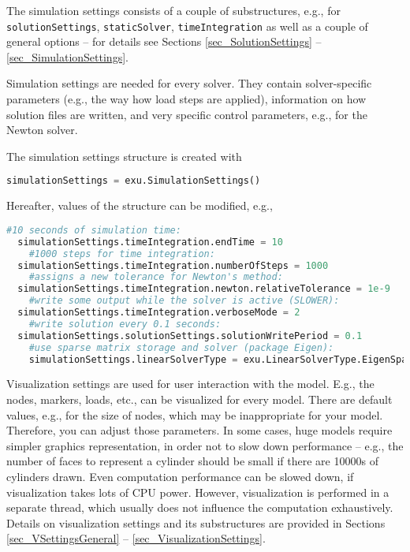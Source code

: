 The simulation settings consists of a couple of substructures, e.g., for \texttt{solutionSettings}, \texttt{staticSolver}, \texttt{timeIntegration} as well as a couple of general options -- for details see Sections \ref{sec_SolutionSettings} -- \ref{sec_SimulationSettings}.

Simulation settings are needed for every solver. They contain solver-specific parameters (e.g., the way how load steps are applied), information on how solution files are written, and very specific control parameters, e.g., for the Newton solver. 

The simulation settings structure is created with 
\pythonstyle
\begin{lstlisting}[language=Python, firstnumber=1]
  simulationSettings = exu.SimulationSettings()
\end{lstlisting}
%
Hereafter, values of the structure can be modified, e.g.,
\begin{lstlisting}[language=Python, firstnumber=1]
	#10 seconds of simulation time:
  simulationSettings.timeIntegration.endTime = 10                    
	#1000 steps for time integration:
  simulationSettings.timeIntegration.numberOfSteps = 1000            
	#assigns a new tolerance for Newton's method:
  simulationSettings.timeIntegration.newton.relativeTolerance = 1e-9 
	#write some output while the solver is active (SLOWER):
  simulationSettings.timeIntegration.verboseMode = 2                 
	#write solution every 0.1 seconds:
  simulationSettings.solutionSettings.solutionWritePeriod = 0.1      
	#use sparse matrix storage and solver (package Eigen):
	simulationSettings.linearSolverType = exu.LinearSolverType.EigenSparse 
\end{lstlisting}

%
Visualization settings are used for user interaction with the model. E.g., the nodes, markers, loads, etc., can be visualized for every model. There are default values, e.g., for the size of nodes, which may be inappropriate for your model. Therefore, you can adjust those parameters. In some cases, huge models require simpler graphics representation, in order not to slow down performance -- e.g., the number of faces to represent a cylinder should be small if there are 10000s of cylinders drawn. Even computation performance can be slowed down, if visualization takes lots of CPU power. However, visualization is performed in a separate thread, which usually does not influence the computation exhaustively.
Details on visualization settings and its substructures are provided in Sections \ref{sec_VSettingsGeneral} -- \ref{sec_VisualizationSettings}.

